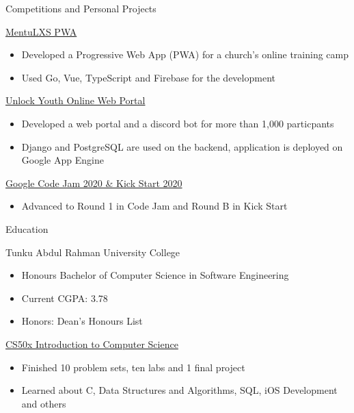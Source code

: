 \documentclass{article}
\newlength{\tabin}
\newlength{\secsep}
\newcommand{\lineunder}{\vspace*{-8pt} \\ \hspace*{-6pt} \hrulefill \\ \vspace*{-15pt}}
\newenvironment{tabbedsection}[1]{
  \begin{list}{}{
      \setlength{\itemsep}{0pt}
      \setlength{\labelsep}{0pt}
      \setlength{\labelwidth}{0pt}
      \setlength{\leftmargin}{\tabin}
      \setlength{\rightmargin}{\tabin}
      \setlength{\listparindent}{0pt}
      \setlength{\parsep}{0pt}
      \setlength{\parskip}{0pt}
      \setlength{\partopsep}{0pt}
      \setlength{\topsep}{#1}
    }
  \item[]
}{\end{list}}
\newenvironment{resume_section}[1]{
  \filbreak
  \vspace{2\secsep}
  \textsc{\large#1}
  \lineunder
  \begin{tabbedsection}{\secsep}
}{\end{tabbedsection}}
\newenvironment{resume_subsection}[2][]{
  \textbf{#2} \hfill {\footnotesize #1} \hspace{2em}
  \begin{tabbedsection}{0.5\secsep}
}{\end{tabbedsection}}
\newenvironment{subitems}{
  \renewcommand{\labelitemi}{-}
  \begin{itemize}
      \setlength{\labelsep}{1em}
}{\end{itemize}}
\begin{document}
\begin{resume_section}{Competitions and Personal Projects}
  \begin{resume_subsection}[(August 2021)]{\href{https://github.com/marcustut/mentu-lxs}{MentuLXS PWA}}
    \begin{subitems}
        \item Developed a Progressive Web App (PWA) for a church's online training camp
        \item Used Go, Vue, TypeScript and Firebase for the development
    \end{subitems}
  \end{resume_subsection}

  \begin{resume_subsection}{\href{https://github.com/marcustut/UnlockProject}{Unlock Youth Online Web Portal}}
    \begin{subitems}
    \item Developed a web portal and a discord bot for more than 1,000 particpants
    \item Django and PostgreSQL are used on the backend, application is deployed on Google App Engine
    \end{subitems}
  \end{resume_subsection}
  
  \begin{resume_subsection}{\href{https://drive.google.com/drive/folders/1PXG8UBWxGFG66U_oSWwOouJDr8cWGGAu?usp=sharing}{Google Code Jam 2020 \& Kick Start 2020}}
    \begin{subitems}
    \item Advanced to Round 1 in Code Jam and Round B in Kick Start
    \end{subitems}
  \end{resume_subsection}
\end{resume_section}


\begin{resume_section}{Education}
  \begin{resume_subsection}{Tunku Abdul Rahman University College}
    \begin{subitems}
      \item Honours Bachelor of Computer Science in Software Engineering
      \item Current CGPA: 3.78
      \item Honors: Dean's Honours List
    \end{subitems}
  \end{resume_subsection}
  
  \begin{resume_subsection}[Online (2020--2021)]{\href{https://drive.google.com/file/d/1-tVq-vD20YwCcI3YgotgKKe_UYvHTwBj/view?usp=sharing}{CS50x Introduction to Computer Science}}
    \begin{subitems}
      \item Finished 10 problem sets, ten labs and 1 final project
      \item Learned about C, Data Structures and Algorithms, SQL, iOS Development and others
     \end{subitems}
  \end{resume_subsection}
\end{resume_section}
\end{document}
